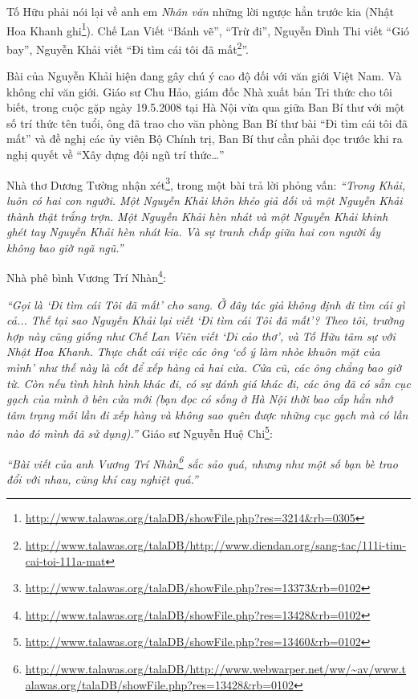 \documentclass[../main.tex]{subfiles}
\begin{document}
\begin{multicols}{2}
Tố Hữu phải nói lại về anh em \textit{Nhân văn} những lời ngược hẳn trước kia (Nhật Hoa Khanh ghi\footnote{\url{http://www.talawas.org/talaDB/showFile.php?res=3214&rb=0305}}). Chế Lan Viết “Bánh vẽ”, “Trừ đi”, Nguyễn Đình Thi viết “Gió bay”, Nguyễn Khải viết “Đi tìm cái tôi đã mất\footnote{\url{http://www.talawas.org/talaDB/http://www.diendan.org/sang-tac/111i-tim-cai-toi-111a-mat}}”. 
 
Bài của Nguyễn Khải hiện đang gây chú ý cao độ đối với văn giới Việt Nam. Và không chỉ văn giới. Giáo sư Chu Hảo, giám đốc Nhà xuất bản Tri thức cho tôi biết, trong cuộc gặp ngày 19.5.2008 tại Hà Nội vừa qua giữa Ban Bí thư với một số trí thức tên tuổi, ông đã trao cho văn phòng Ban Bí thư bài “Đi tìm cái tôi đã mất” và đề nghị các ủy viên Bộ Chính trị, Ban Bí thư cần phải đọc trước khi ra nghị quyết về “Xây dựng đội ngũ trí thức…” 
 
Nhà thơ Dương Tường nhận xét\footnote{\url{http://www.talawas.org/talaDB/showFile.php?res=13373&rb=0102}}, trong một bài trả lời phỏng vấn: 
\textit{\textbf{	}} 
\textit{“Trong Khải, luôn có hai con người. Một Nguyễn Khải khôn khéo giả dối và một Nguyễn Khải thành thật trắng trợn. Một Nguyễn Khải hèn nhát và một Nguyễn Khải khinh ghét tay Nguyễn Khải hèn nhát kia. Và sự tranh chấp giữa hai con người ấy không bao giờ ngã ngũ.”} 
 
Nhà phê bình Vương Trí Nhàn\footnote{\url{http://www.talawas.org/talaDB/showFile.php?res=13428&rb=0102}}: 
 
\textit{“Gọi là ‘Đi tìm cái Tôi đã mất’ cho sang. Ở đây tác giả không định đi tìm cái gì cả... Thế tại sao Nguyễn Khải lại viết ‘Đi tìm cái Tôi đã mất’? Theo tôi, trường hợp này cũng giống như Chế Lan Viên viết ‘Di cảo thơ’, và Tố Hữu tâm sự với Nhật Hoa Khanh. Thực chất cái việc các ông ‘cố ý làm nhòe khuôn mặt của mình’ như thế này là cốt để xếp hàng cả hai cửa. Cửa cũ, các ông chẳng bao giờ từ. Còn nếu tình hình hình khác đi, có sự đánh giá khác đi, các ông đã có sẵn cục gạch của mình ở bên cửa mới (bạn đọc có sống ở Hà Nội thời bao cấp hẳn nhớ tâm trạng mỗi lần đi xếp hàng và không sao quên được những cục gạch mà có lần nào đó mình đã sử dụng).”  } 
\textit{\textbf{		}}	 
Giáo sư Nguyễn Huệ Chi\footnote{\url{http://www.talawas.org/talaDB/showFile.php?res=13460&rb=0102}}: 
 
\textit{“Bài viết của anh Vương Trí Nhàn\footnote{\url{http://www.talawas.org/talaDB/http://www.webwarper.net/ww/~av/www.talawas.org/talaDB/showFile.php?res=13428&rb=0102}} sắc sảo quá, nhưng như một số bạn bè trao đổi với nhau, cũng khí cay nghiệt quá.”} 
 

\end{multicols}
\end{document}
